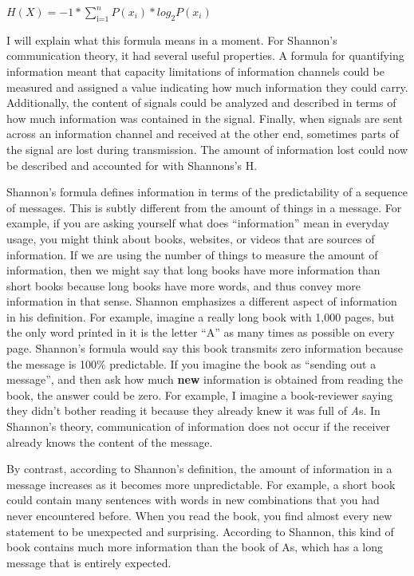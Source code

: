 \documentclass[
  oneside,
  12pt]{crumpbook}
\begin{document}
\(H(X) = -1*\sum_\text{i=1}^n P(x_i) * log_2 P(x_i)\)

I will explain what this formula means in a moment. For Shannon's communication theory, it had several useful properties. A formula for quantifying information meant that capacity limitations of information channels could be measured and assigned a value indicating how much information they could carry. Additionally, the content of signals could be analyzed and described in terms of how much information was contained in the signal. Finally, when signals are sent across an information channel and received at the other end, sometimes parts of the signal are lost during transmission. The amount of information lost could now be described and accounted for with Shannons's H.

Shannon's formula defines information in terms of the predictability of a sequence of messages. This is subtly different from the amount of things in a message. For example, if you are asking yourself what does ``information'' mean in everyday usage, you might think about books, websites, or videos that are sources of information. If we are using the number of things to measure the amount of information, then we might say that long books have more information than short books because long books have more words, and thus convey more information in that sense. Shannon emphasizes a different aspect of information in his definition. For example, imagine a really long book with 1,000 pages, but the only word printed in it is the letter ``A'' as many times as possible on every page. Shannon's formula would say this book transmits zero information because the message is 100\% predictable. If you imagine the book as ``sending out a message'', and then ask how much \textbf{new} information is obtained from reading the book, the answer could be zero. For example, I imagine a book-reviewer saying they didn't bother reading it because they already knew it was full of \emph{A}s. In Shannon's theory, communication of information does not occur if the receiver already knows the content of the message.

By contrast, according to Shannon's definition, the amount of information in a message increases as it becomes more unpredictable. For example, a short book could contain many sentences with words in new combinations that you had never encountered before. When you read the book, you find almost every new statement to be unexpected and surprising. According to Shannon, this kind of book contains much more information than the book of As, which has a long message that is entirely expected.
\end{document}
